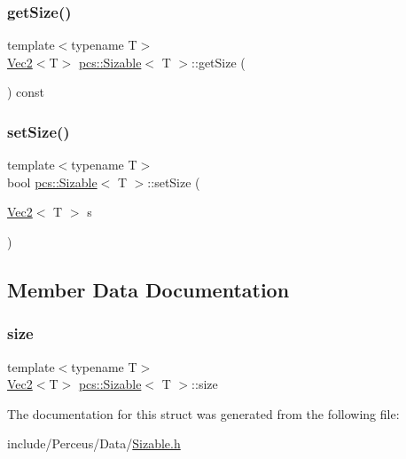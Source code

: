 \subsubsection{\texorpdfstring{get\+Size()}{getSize()}}
{\footnotesize\ttfamily template$<$typename T$>$ \\
\hyperlink{structpcs_1_1Vec2}{Vec2}$<$T$>$ \hyperlink{structpcs_1_1Sizable}{pcs\+::\+Sizable}$<$ T $>$\+::get\+Size (\begin{DoxyParamCaption}{ }\end{DoxyParamCaption}) const\hspace{0.3cm}{\ttfamily [inline]}}

\mbox{\label{structpcs_1_1Sizable_a356e9bf805e68bfff1990ee324088d65}} 
\subsubsection{\texorpdfstring{set\+Size()}{setSize()}}
{\footnotesize\ttfamily template$<$typename T$>$ \\
bool \hyperlink{structpcs_1_1Sizable}{pcs\+::\+Sizable}$<$ T $>$\+::set\+Size (\begin{DoxyParamCaption}\item[{\hyperlink{structpcs_1_1Vec2}{Vec2}$<$ T $>$}]{s }\end{DoxyParamCaption})\hspace{0.3cm}{\ttfamily [inline]}}



\subsection{Member Data Documentation}
\mbox{\label{structpcs_1_1Sizable_a52fe8b008a1fe91dd9a0766055d433a3}} 
\subsubsection{\texorpdfstring{size}{size}}
{\footnotesize\ttfamily template$<$typename T$>$ \\
\hyperlink{structpcs_1_1Vec2}{Vec2}$<$T$>$ \hyperlink{structpcs_1_1Sizable}{pcs\+::\+Sizable}$<$ T $>$\+::size}



The documentation for this struct was generated from the following file\+:\begin{DoxyCompactItemize}
\item 
include/\+Perceus/\+Data/\hyperlink{Sizable_8h}{Sizable.\+h}\end{DoxyCompactItemize}
